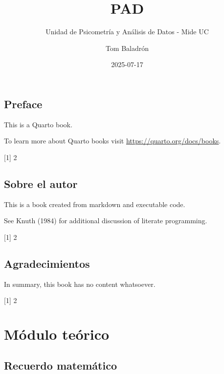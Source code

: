 \documentclass[
  letterpaper,
  DIV=11,
  numbers=noendperiod]{scrreprt}
\title{PAD}
\subtitle{Unidad de Psicometría y Análisis de Datos - Mide UC}
\author{Tom Baladrón}
\date{2025-07-17}
\renewcommand*\contentsname{Table of contents}
\newcommand\contentsname{Table of contents}
\begin{document}
\maketitle

\renewcommand*\contentsname{Table of contents}
{
\hypersetup{linkcolor=}
\setcounter{tocdepth}{2}
\tableofcontents
}


\chapter*{Preface}\label{preface}


This is a Quarto book.

To learn more about Quarto books visit
\url{https://quarto.org/docs/books}.

{[}1{]} 2


\chapter*{Sobre el autor}\label{sobre-el-autor}


This is a book created from markdown and executable code.

See Knuth (1984) for additional discussion of literate programming.

{[}1{]} 2


\chapter*{Agradecimientos}\label{agradecimientos}


In summary, this book has no content whatsoever.

{[}1{]} 2

\part{Módulo teórico}

\chapter{Recuerdo matemático}\label{recuerdo-matemuxe1tico}
\end{document}
